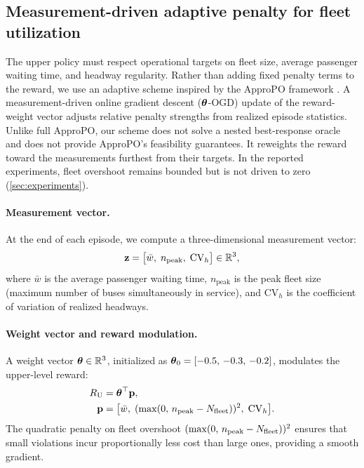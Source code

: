 \subsection{Measurement-driven adaptive penalty for fleet utilization}
\label{sec:meas_proj}

The upper policy must respect operational targets on fleet size, average passenger waiting time, and headway regularity.
Rather than adding fixed penalty terms to the reward, we use an adaptive scheme inspired by the ApproPO framework \citep{miryoosefi2019reinforcement}. A measurement-driven online gradient descent ($\boldsymbol{\theta}$-OGD) update of the reward-weight vector adjusts relative penalty strengths from realized episode statistics. Unlike full ApproPO, our scheme does not solve a nested best-response oracle and does not provide ApproPO's feasibility guarantees. It reweights the reward toward the measurements furthest from their targets. In the reported experiments, fleet overshoot remains bounded but is not driven to zero (\cref{sec:experiments}).

\paragraph{Measurement vector.}
At the end of each episode, we compute a three-dimensional measurement vector:
\begin{equation}
\label{eq:measurement_method}
    \mathbf{z} = \bigl[\bar{w},\; n_{\mathrm{peak}},\; \mathrm{CV}_{h}\bigr] \in \mathbb{R}^3,
\end{equation}
where $\bar{w}$ is the average passenger waiting time, $n_{\mathrm{peak}}$ is the peak fleet size (maximum number of buses simultaneously in service), and $\mathrm{CV}_{h}$ is the coefficient of variation of realized headways.

\paragraph{Weight vector and reward modulation.}
A weight vector $\boldsymbol{\theta} \in \mathbb{R}^3$, initialized as $\boldsymbol{\theta}_0 = [-0.5,\, -0.3,\, -0.2]$, modulates the upper-level reward:
\begin{equation}
\label{eq:upper_reward}
\begin{aligned}
    R_{\mathrm{U}} &= \boldsymbol{\theta}^\top \mathbf{p},\\
    \mathbf{p} &= \bigl[\bar{w},\; (\max(0,\, n_{\mathrm{peak}} - N_{\mathrm{fleet}}))^2,\; \mathrm{CV}_{h}\bigr].
\end{aligned}
\end{equation}
The quadratic penalty on fleet overshoot $(\max(0,\, n_{\mathrm{peak}} - N_{\mathrm{fleet}}))^2$ ensures that small violations incur proportionally less cost than large ones, providing a smooth gradient.

